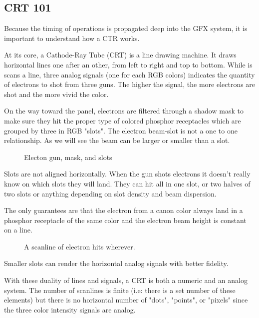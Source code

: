 \subsection{CRT 101}

Because the timing of operations is propagated deep into the GFX system, it is important to understand how a CTR works.

At its core, a Cathode-Ray Tube (CRT) is a line drawing machine. It draws horizontal lines one after an other, from left to right and top to bottom. While is scans a line, three analog signals (one for each RGB colors) indicates the quantity of electrons to shot from three guns. The higher the signal, the more electrons are shot and the more vivid the color.


On the way toward the panel, electrons are filtered through a shadow mask to make sure they hit the proper type of colored phosphor receptacles which are grouped by three in RGB "slots". The electron beam-slot is not a one to one relationship. As we will see the beam can be larger or smaller than a slot.





\begin{figure}[H]
\caption*{Electon gun, mask, and slots}
\end{figure}

Slots are not aligned horizontally. When the gun shots electrons it doesn't really know on which slots they will land. They can hit all in one slot, or two halves of two slots or anything depending on slot density and beam dispersion. 

The only guarantees are that the electron from a canon color always land in a phosphor receptacle of the same color and the electron beam height is constant on a line.

\begin{figure}[H]
\caption*{A scanline of electron hits wherever.}
\end{figure}

Smaller slots can render the horizontal analog signals with better fidelity.





 With these duality of lines and signals, a CRT is both a numeric and an analog system. The number of scanlines is finite (i.e: there is a set number of these elements) but there is no horizontal number of "dots", "points", or "pixels" since the three color intensity signals are analog.


